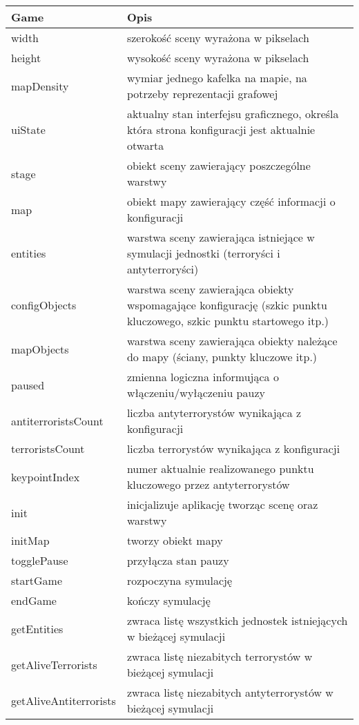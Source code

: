 \begin{table}
\begin{center}
\begin{tabular}{|p{}|p{}|}
\hline
\textbf{Game} & Opis\\\hline		
	width & szerokość sceny wyrażona w pikselach\\
	height & wysokość sceny wyrażona w pikselach\\
	mapDensity & wymiar jednego kafelka na mapie, na potrzeby reprezentacji grafowej\\
	uiState & aktualny stan interfejsu graficznego, określa która strona konfiguracji jest aktualnie otwarta\\
	stage & obiekt sceny zawierający poszczególne warstwy\\
	map & obiekt mapy zawierający część informacji o konfiguracji\\ 
	entities & warstwa sceny zawierająca istniejące w symulacji jednostki (terroryści i antyterroryści)\\
	configObjects & warstwa sceny zawierająca obiekty wspomagające konfigurację (szkic punktu kluczowego, szkic punktu startowego itp.)\\
	mapObjects & warstwa sceny zawierająca obiekty należące do mapy (ściany, punkty kluczowe itp.)\\
	paused & zmienna logiczna informująca o włączeniu/wyłączeniu pauzy\\
	antiterroristsCount & liczba antyterrorystów wynikająca z konfiguracji\\
	terroristsCount & liczba terrorystów wynikająca z konfiguracji\\
	keypointIndex & numer aktualnie realizowanego punktu kluczowego przez antyterrorystów
\\\hline
	init & inicjalizuje aplikację tworząc scenę oraz warstwy\\
	initMap & tworzy obiekt mapy\\
	togglePause & przyłącza stan pauzy\\
	startGame & rozpoczyna symulację\\ 
	endGame & kończy symulację\\
	getEntities & zwraca listę wszystkich jednostek istniejących w bieżącej symulacji\\
	getAliveTerrorists & zwraca listę niezabitych terrorystów w bieżącej symulacji\\ 
	getAliveAntiterrorists & zwraca listę niezabitych antyterrorystów w bieżącej symulacji\\

\end{tabular}
\end{center}
\end{table}
